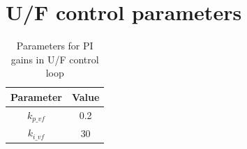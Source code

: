 \section{U/F control parameters}
\begin{table}[H]
\centering
\begin{tabular}{|c|c|}
\hline
Parameter & Value \\ \hline
$k_{p\_vf}$     & 0.2 \\ \hline
$k_{i\_vf}$     & 30 \\ \hline
\end{tabular}
\caption{Parameters for PI gains in U/F control loop \cite{vrana2013cigre}}
\label{tab:U_F_para}
\end{table}
